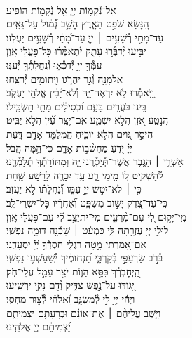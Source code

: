 \documentclass[twoside, openany, parskip=half, 11pt]{book}
\begin{document}
{\\
\vspace{-1.5\baselineskip}
\begin{narrow}
%
אֵל־נְ֯קָמ֥וֹת יְיָ֑ \hfill אֵ֖ל נְ֯קָמ֣וֹת הוֹפִֽיעַ׃ \\
הִ֭נָּשֵׂא שֹׁפֵ֣ט הָאָ֑רֶץ \hfill הָשֵׁ֥ב גְּ֯֝מ֗וּל עַל־גֵּאִֽים׃ \\
עַד־מָתַ֖י רְ֯שָׁעִ֥ים ׀ יְיָ֑ \hfill עַד־מָ֝תַ֗י רְ֯שָׁעִ֥ים יַעֲלֹֽזוּ׃ \\
יַבִּ֣יעוּ יְ֯דַבְּ֯ר֣וּ עָתָ֑ק \hfill יִ֝תְאַמְּ֯ר֗וּ כׇּל־פֹּ֥עֲלֵי אָֽוֶן׃ \\
עַמְּ֯ךָ֣ יְיָ֣ יְ֯דַכְּ֯א֑וּ \hfill וְֽ֯נַחֲלָתְ֯ךָ֥ יְ֯עַנּֽוּ׃ \\
אַלְמָנָ֣ה וְ֯גֵ֣ר יַהֲרֹ֑גוּ \hfill וִ֖יתוֹמִ֣ים יְ֯רַצֵּֽחוּ׃ \\
וַ֭יֹּ֣אמְ֯רוּ לֹ֣א יִרְאֶה־יָּ֑הּ \hfill וְ֯לֹא־יָ֝בִ֗ין אֱלֹהֵ֥י יַעֲקֹֽב׃ \\
בִּ֭ינוּ בֹּעֲרִ֣ים בָּעָ֑ם \hfill וּ֝כְסִילִ֗ים מָתַ֥י תַּשְׂכִּֽילוּ׃ \\
הֲנֹ֣טַֽע אֹ֭זֶן הֲלֹ֣א יִשְׁמָ֑ע \hfill אִֽם־יֹ֥צֵֽר עַ֗֝יִן הֲלֹ֣א יַבִּֽיט׃ \\
הֲיֹסֵ֣ר גּ֭וֹיִם הֲלֹ֣א יוֹכִ֑יחַ \hfill הַֽמְלַמֵּ֖ד אָדָ֣ם דָּֽעַת׃ \\
יְיָ֗ יֹ֭דֵעַ מַחְשְׁ֯ב֣וֹת אָדָ֑ם \hfill כִּי־הֵ֥מָּה הָֽבֶל׃ \\
אַשְׁרֵ֤י ׀ הַגֶּ֣בֶר אֲשֶׁר־תְּ֯יַסְּ֯רֶ֣נּוּ יָּ֑הּ \hfill וּֽמִתּוֹרָתְ֯ךָ֥ תְ֯לַמְּ֯דֶֽנּוּ׃ \\
לְ֯הַשְׁקִ֣יט ל֭וֹ מִ֣ימֵי רָ֑ע \hfill עַ֤ד יִכָּרֶ֖ה לָרָשָׁ֣ע שָֽׁחַת׃ \\
כִּ֤י ׀ לֹא־יִטֹּ֣שׁ יְיָ֣ עַמּ֑וֹ \hfill וְ֯֝נַחֲלָת֗וֹ לֹ֣א יַעֲזֹֽב׃ \\
כִּֽי־עַד־צֶ֭דֶק יָשׁ֣וּב מִשְׁפָּ֑ט \hfill וְ֯֝אַחֲרָ֗יו כׇּל־יִשְׁרֵי־לֵֽב׃ \\
מִֽי־יָק֣וּם לִ֭י עִם־מְ֯רֵעִ֑ים \hfill מִי־יִתְיַצֵּ֥ב לִ֗֝י עִם־פֹּ֥עֲלֵי אָֽוֶן׃ \\
לוּלֵ֣י יְיָ֭ עֶזְרָ֣תָה לִּ֑י \hfill כִּמְעַ֓ט ׀ שָׁכְ֯נָ֖ה דוּמָ֣ה נַפְשִֽׁי׃ \\
אִם־אָ֭מַרְתִּי מָ֣טָה רַגְלִ֑י \hfill חַסְדְּ֯ךָ֥ יְ֝יָ֗ יִסְעָדֵֽנִי׃ \\
בְּ֯רֹ֣ב שַׂרְעַפַּ֣י בְּ֯קִרְבִּ֑י \hfill תַּ֝נְחוּמֶ֗יךָ יְֽ֯שַׁעַשְׁע֥וּ נַפְשִֽׁי׃ \\
הַֽ֭יְחׇבְרְ֯ךָ כִּסֵּ֣א הַוּ֑וֹת \hfill יֹצֵ֖ר עָמָ֣ל עֲלֵי־חֹֽק׃ \\
יָ֭גוֹדּוּ עַל־נֶ֣פֶשׁ צַדִּ֑יק \hfill וְ֯דָ֖ם נָקִ֣י יַרְשִֽׁיעוּ׃ \\
וַיְהִ֬י יְיָ֣ לִ֣י לְ֯מִשְׂגָּ֑ב \hfill וֵ֝אלֹהַ֗י לְ֯צ֣וּר מַחְסִֽי׃ \\
וַיָּ֤שֶׁב עֲלֵיהֶ֨ם ׀ אֶת־אוֹנָ֗ם \hfill וּבְרָעָתָ֥ם יַצְמִיתֵ֑ם\\ יַ֝צְמִיתֵ֗ם יְיָ֥ אֱלֹהֵֽינוּ׃ \hfill \break


\end{narrow}}
\end{document}
